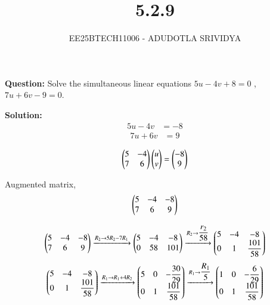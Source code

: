 \documentclass[journal]{IEEEtran}
\begin{document}

\vspace{3cm}

\title{5.2.9}
\author{EE25BTECH11006 - ADUDOTLA SRIVIDYA}
{\let\newpage\relax\maketitle}

\renewcommand{\thefigure}{\theenumi}
\renewcommand{\thetable}{\theenumi}
\setlength{\intextsep}{10pt}


\textbf{Question:}
Solve the simultaneous linear equations
$5u-4v+8=0$ , $7u+6v-9=0$.

\textbf{Solution:}\\
\begin{align}
5u - 4v &= -8 
\end{align}
\begin{align}
7u + 6v &= 9
\end{align}

\begin{align}
\begin{pmatrix}5 & -4 \\ 7 & 6\end{pmatrix}\begin{pmatrix}u \\ v\end{pmatrix}=\begin{pmatrix}-8 \\ 9\end{pmatrix}
\end{align}

Augmented matrix,
\begin{align}
\begin{pmatrix}5 & -4 & -8 \\ 7 & 6 & 9\end{pmatrix} 
\end{align}

\begin{align}
\begin{pmatrix}5 & -4 & -8 \\ 7 & 6 & 9\end{pmatrix}
\xrightarrow{R_2 \rightarrow 5R_2-7R_1}
\begin{pmatrix}5 & -4 & -8 \\ 0 & 58 & 101\end{pmatrix}
\xrightarrow{R_2 \rightarrow \dfrac{r_2}{58}}
\begin{pmatrix}5 & -4 & -8 \\ 0 & 1 & \dfrac{101}{58}\end{pmatrix}
\end{align}
\begin{align}
\begin{pmatrix}5 & -4 & -8 \\ 0 & 1 & \dfrac{101}{58}\end{pmatrix}
\xrightarrow{R_1 \rightarrow R_1+4R_2}
\begin{pmatrix}5 & 0 & -\dfrac{30}{29} \\ 0 & 1 & \dfrac{101}{58}\end{pmatrix}
\xrightarrow{R_1 \rightarrow \dfrac{R_1}{5}}
\begin{pmatrix}1 & 0 & -\dfrac{6}{29} \\ 0 & 1 & \dfrac{101}{58}\end{pmatrix}
\end{align}
\end{document}
